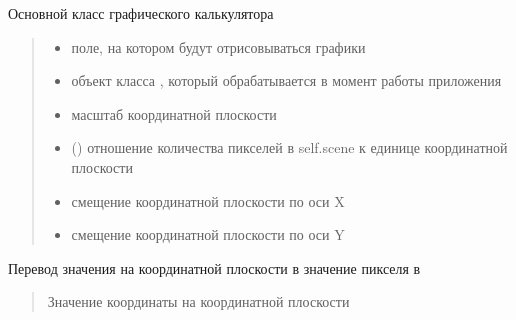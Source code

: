 \documentclass[letterpaper,10pt,russian]{sphinxmanual}
\begin{document}
\begin{fulllineitems}
\label{\detokenize{src:main.GraphicCalculator}}
\pysigstartsignatures
\pysigline
{}
\pysigstopsignatures
\sphinxAtStartPar
Основной класс графического калькулятора
\begin{quote}\begin{description}
\begin{itemize}
\item {} 
\sphinxAtStartPar
{} \textendash{} поле, на котором будут отрисовываться графики

\item {} 
\sphinxAtStartPar
{} \textendash{} объект класса {\hyperref[\detokenize{src:main.MathFunction}]{}}, который обрабатывается в момент работы приложения

\item {} 
\sphinxAtStartPar
{} \textendash{} масштаб координатной плоскости

\item {} 
\sphinxAtStartPar
{} () \textendash{} отношение количества пикселей в self.scene к единице координатной плоскости

\item {} 
\sphinxAtStartPar
{} \textendash{} смещение координатной плоскости по оси X

\item {} 
\sphinxAtStartPar
{} \textendash{} смещение координатной плоскости по оси Y

\end{itemize}

\end{description}\end{quote}

\begin{fulllineitems}
\label{\detokenize{src:main.GraphicCalculator.coords_to_pix}}
\pysigstartsignatures
\pysiglinewithargsret
{}
{}
{}
\pysigstopsignatures
\sphinxAtStartPar
Перевод значения на координатной плоскости в значение пикселя в 
\begin{quote}\begin{description}
\sphinxAtStartPar
{} \textendash{} Значение координаты на координатной плоскости


\end{description}
\end{quote}
\end{fulllineitems}
\end{fulllineitems}
\end{document}
